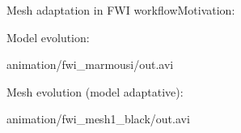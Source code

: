 \begin{frame}{Mesh adaptation in FWI workflow}{Motivation:}
  \begin{block}{Model evolution:}
    \begin{center}
            {animation/fwi_marmousi/out.avi}
    \end{center}
  \end{block}

  \begin{block}{Mesh evolution (model adaptative):}
    \begin{center}
            {animation/fwi_mesh1_black/out.avi}
    \end{center}
  \end{block}
\end{frame}


